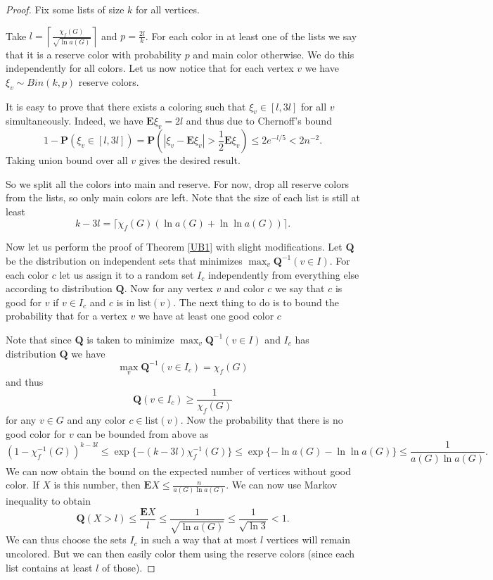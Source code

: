 \documentclass[12pt]{article}
\theoremstyle{remark}
\theoremstyle{definition}
\newcommand{\mP}{\mathbf{P}}
\newcommand{\mQ}{\mathbf{Q}}
\newcommand{\mE}{\mathbf{E}}
\newcommand{\lst}{\mathrm{list}}
\newcommand{\skob}[1]{\left(#1\right)}
\begin{document}
\begin{proof}
    Fix some lists of size $k$ for all vertices.
    
    Take $l = \left\lceil\frac{\chi_f(G)}{\sqrt{\ln a(G)}}\right\rceil$ and $p = \frac{2l}{k}$. For each color in at least one of the lists we say that it is a reserve color with probability $p$ and main color otherwise. We do this independently for all colors. Let us now notice that for each vertex $v$ we have $\xi_v \sim Bin(k,p)$ reserve colors. 

    It is easy to prove that there exists a coloring such that $\xi_v \in [l, 3l]$ for all $v$ simultaneously. Indeed, we have $\mE \xi_v = 2l$ and thus due to Chernoff's bound
    $$
       1-\mP(\xi_v \in [l, 3l]) = \mP\skob{|\xi_v - \mE\xi_v| > \frac{1}{2}\mE\xi_v} \leq 2e^{-l/5} < 2n^{-2}.
    $$
    Taking union bound over all $v$ gives the desired result.

    So we split all the colors into main and reserve. For now, drop all reserve colors from the lists, so only main colors are left. Note that the size of each list is still at least 
    $$
        k - 3l = \lceil\chi_f(G)\skob{\ln a(G) + \ln \ln a(G)}\rceil.
    $$

    Now let us perform the proof of Theorem \ref{UB1} with slight modifications. Let $\mathbf{Q}$ be the distribution on independent sets that minimizes $\max_{v} \mQ^{-1}(v \in I)$. For each color $c$ let us assign it to a random set $I_c$ independently from everything else according to distribution $\mQ$. Now for any vertex $v$ and color $c$ we say that $c$ is good for $v$ if $v \in I_c$ and $c$ is in $\lst(v)$. The next thing to do is to bound the probability that for a vertex $v$ we have at least one good color $c$
    
    Note that since $\mQ$ is taken to minimize $\max_{v} \mQ^{-1}(v \in I)$ and $I_c$ has distribution $\mQ$ we have $$\max_{v} \mQ^{-1}(v \in I_c) = \chi_f(G)$$ and thus
    $$
        \mQ(v \in I_c) \geq \frac{1}{\chi_f(G)}
    $$
    for any $v \in G$ and any color $c \in \lst(v)$. Now the probability that there is no good color for $v$ can be bounded from above as 
    $$
    (1 - \chi_f^{-1}(G))^{k-3l} \leq \exp\{-(k-3l)\chi_f^{-1}(G)\} \leq \exp\{-\ln a(G) - \ln \ln a(G)\} \leq \frac{1}{a(G)\ln a(G)}.
    $$
    We can now obtain the bound on the expected number of vertices without good color. If $X$ is this number, then $\mE X \leq \frac{n}{a(G)\ln a(G)}$. We can now use Markov inequality to obtain
    $$
        \mQ(X > l) \leq \frac{\mE X}{l} \leq \frac{1}{\sqrt{\ln a(G)}} \leq \frac{1}{\sqrt{\ln 3}} < 1.
    $$
    We can thus choose the sets $I_c$ in such a way that at most $l$ vertices will remain uncolored. But we can then easily color them using the reserve colors (since each list contains at least $l$ of those). 
\end{proof}

\printbibliography
\end{document}
